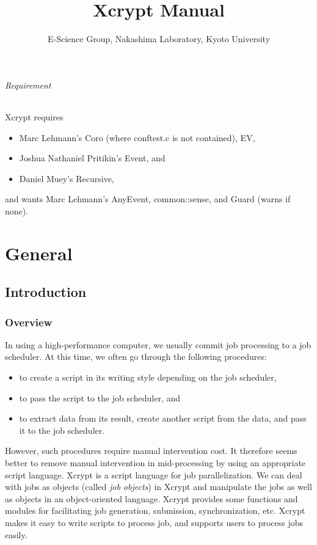 \documentclass[a4paper,10pt]{report}
\title{Xcrypt Manual}
\author{E-Science Group, Nakashima Laboratory, Kyoto University}
\begin{document}
\maketitle
\tableofcontents

\paragraph{Requirement}

Xcrypt requires
\begin{itemize}
\item Marc Lehmann's Coro (where conftest.c is not contained), EV,
\item Joshua Nathaniel Pritikin's Event, and
\item Daniel Muey's Recursive,
\end{itemize}
and wants Marc Lehmann's AnyEvent, common::sense, and Guard (warns if
none).

\part{General}
\chapter{Introduction}

\section{Overview}

In using a high-performance computer, we usually commit job processing
to a job scheduler.  At this time, we often go through the following
procedures:
\begin{itemize}
\item to create a script in its writing style depending on the
      job scheduler,
\item to pass the script to the job scheduler, and
\item to extract data from its result, create another script from
      the data, and pass it to the job scheduler.
\end{itemize}

However, such procedures require manual intervention cost.  It
therefore seems better to remove manual intervention in mid-processing
by using an appropriate script language.  Xcrypt is a script language
for job parallelization.  We can deal with jobs as objects (called
\textit{job objects}) in Xcrypt and manipulate the jobs as well as
objects in an object-oriented language.  Xcrypt provides some
functions and modules for facilitating job generation, submission,
synchronization, etc.  Xcrypt makes it easy to write scripts to process
job, and supports users to process jobs easily.
\end{document}
